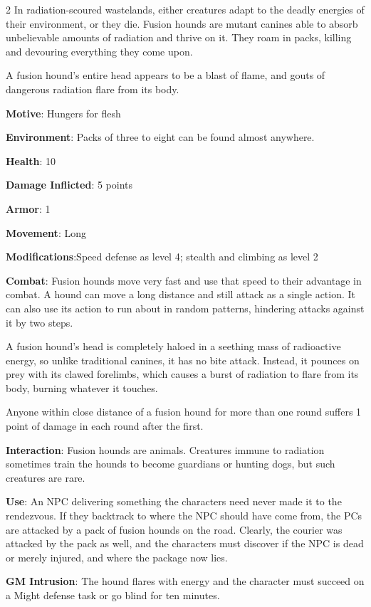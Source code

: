 \begin{multicols}{2}
In radiation-scoured wastelands, either creatures adapt to the deadly energies of their environment, or they die. Fusion hounds are mutant canines able to absorb unbelievable amounts of radiation and thrive on it. They roam in packs, killing and devouring everything they come upon.

A fusion hound’s entire head appears to be a blast of flame, and gouts of dangerous radiation flare from its body.

\textbf{Motive}: Hungers for flesh

\textbf{Environment}: Packs of three to eight can be found almost anywhere.

\textbf{Health}: 10

\textbf{Damage Inflicted}: 5 points

\textbf{Armor}: 1

\textbf{Movement}: Long

\textbf{Modifications}:Speed defense as level 4; stealth and climbing as level 2

\textbf{Combat}: Fusion hounds move very fast and use that speed to their advantage in combat. A hound can move a long distance and still attack as a single action. It can also use its action to run about in random patterns, hindering attacks against it by two steps.

A fusion hound’s head is completely haloed in a seething mass of radioactive energy, so unlike traditional canines, it has no bite attack. Instead, it pounces on prey with its clawed forelimbs, which causes a burst of radiation to flare from its body, burning whatever it touches.

Anyone within close distance of a fusion hound for more than one round suffers 1 point of damage in each round after the first.

\textbf{Interaction}: Fusion hounds are animals. Creatures immune to radiation sometimes train the hounds to become guardians or hunting dogs, but such creatures are rare.

\textbf{Use}: An NPC delivering something the characters need never made it to the rendezvous. If they backtrack to where the NPC should have come from, the PCs are attacked by a pack of fusion hounds on the road. Clearly, the courier was attacked by the pack as well, and the characters must discover if the NPC is dead or merely injured, and where the package now lies.

\textbf{GM Intrusion}: The hound flares with energy and the character must succeed on a Might defense task or go blind for ten minutes.


\end{multicols}
